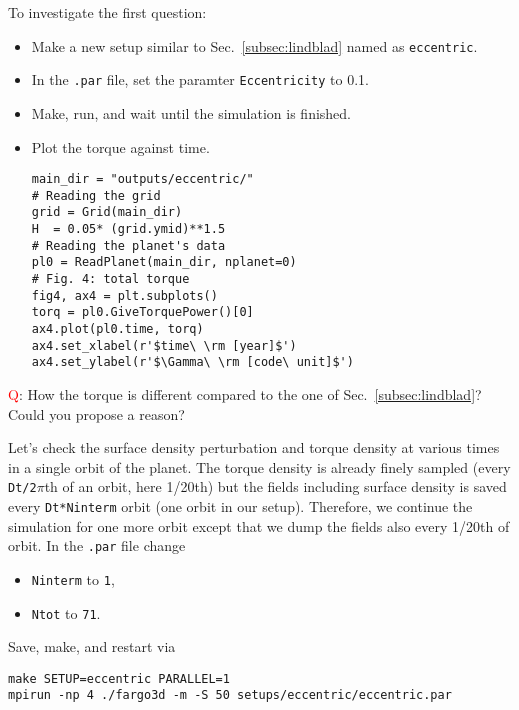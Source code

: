 \documentclass[14pt]{scrartcl}
\begin{document}
To investigate the first question:
\begin{itemize}
	\item Make a new setup similar to Sec.~\ref{subsec:lindblad} named as \texttt{eccentric}.
	\item In the \texttt{.par} file, set the paramter \texttt{Eccentricity} to 0.1.
	\item Make, run, and wait until the simulation is finished.
	\item Plot the torque against time.
	\begin{verbatim}
main_dir = "outputs/eccentric/"
# Reading the grid
grid = Grid(main_dir)
H  = 0.05* (grid.ymid)**1.5
# Reading the planet's data
pl0 = ReadPlanet(main_dir, nplanet=0)
# Fig. 4: total torque
fig4, ax4 = plt.subplots()
torq = pl0.GiveTorquePower()[0]
ax4.plot(pl0.time, torq)
ax4.set_xlabel(r'$time\ \rm [year]$')
ax4.set_ylabel(r'$\Gamma\ \rm [code\ unit]$')
\end{verbatim}
\end{itemize} 
\textcolor{red}{Q}: How the torque is different compared to the one of Sec.~\ref{subsec:lindblad}? Could you propose a reason?

Let's check the surface density perturbation and torque density at various times in a single orbit of the planet. The torque density is already finely sampled (every \texttt{Dt/2$\pi$}th of an orbit, here 1/20th) but the fields including surface density is saved every \texttt{Dt*Ninterm} orbit (one orbit in our setup). Therefore, we continue the simulation for one more orbit except that we dump the fields also every 1/20th of orbit. In the \texttt{.par} file change
\begin{itemize}
	\item \texttt{Ninterm} to \texttt{1},
	\item \texttt{Ntot} to \texttt{71}.
\end{itemize} 
Save, make, and restart via 
\begin{verbatim}
make SETUP=eccentric PARALLEL=1
mpirun -np 4 ./fargo3d -m -S 50 setups/eccentric/eccentric.par
\end{verbatim}
\end{document}
